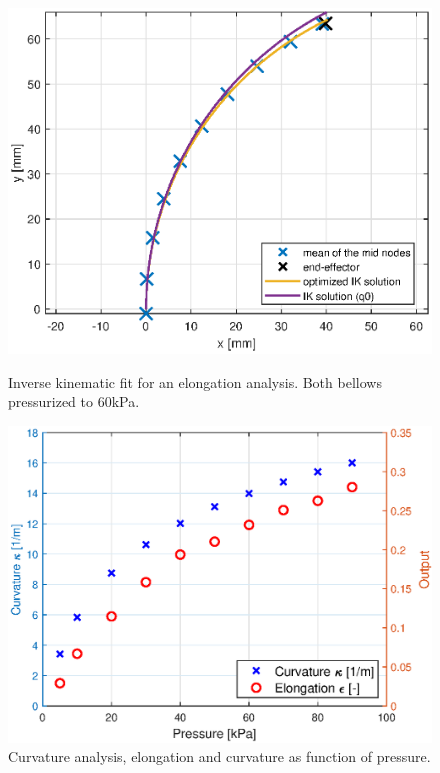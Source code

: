 \begin{figure}[H]
\begin{minipage}{0.5\textwidth}
        \label{fig3:nodalcurvatrue}
    \end{minipage}
\begin{minipage}{0.5\textwidth}
        \centering
        \includegraphics[width=\textwidth]{Figures/Chapter3/nodalfit.eps}
        \caption{Inverse kinematic fit for an elongation analysis. Both bellows pressurized to 60kPa.}
        \label{fig3:nodalfitcurv}
    \end{minipage}\hfill
    \begin{minipage}{0.5\textwidth}
        \centering
        \includegraphics[width=\textwidth]{Figures/Chapter3/rotationvspressure.eps} 
        \caption{Curvature analysis, elongation and curvature as function of pressure.}
        \label{fig3:rotationvspressure}
    \end{minipage}
\end{figure}







